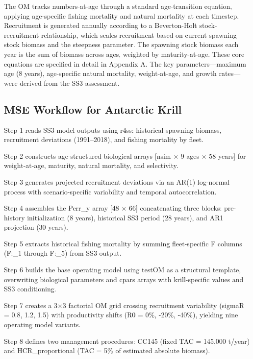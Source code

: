\documentclass[
]{article}
\begin{document}
The OM tracks numbers-at-age through a standard age-transition equation, applying age-specific fishing mortality and natural mortality at each timestep. Recruitment is generated annually according to a Beverton-Holt stock-recruitment relationship, which scales recruitment based on current spawning stock biomass and the steepness parameter. The spawning stock biomass each year is the sum of biomass across ages, weighted by maturity-at-age. These core equations are specified in detail in Appendix A. The key parameters---maximum age (8 years), age-specific natural mortality, weight-at-age, and growth rates---were derived from the SS3 assessment.

\hypertarget{mse-workflow-for-antarctic-krill}{%
\subsection{MSE Workflow for Antarctic Krill}\label{mse-workflow-for-antarctic-krill}}

Step 1 reads SS3 model outputs using r4ss: historical spawning biomass, recruitment deviations (1991--2018), and fishing mortality by fleet.

Step 2 constructs age-structured biological arrays {[}nsim × 9 ages × 58 years{]} for weight-at-age, maturity, natural mortality, and selectivity.

Step 3 generates projected recruitment deviations via an AR(1) log-normal process with scenario-specific variability and temporal autocorrelation.

Step 4 assembles the Perr\_y array {[}48 × 66{]} concatenating three blocks: pre-history initialization (8 years), historical SS3 period (28 years), and AR1 projection (30 years).

Step 5 extracts historical fishing mortality by summing fleet-specific F columns (F:\_1 through F:\_5) from SS3 output.

Step 6 builds the base operating model using testOM as a structural template, overwriting biological parameters and cpars arrays with krill-specific values and SS3 conditioning.

Step 7 creates a 3×3 factorial OM grid crossing recruitment variability (sigmaR = 0.8, 1.2, 1.5) with productivity shifts (R0 = 0\%, -20\%, -40\%), yielding nine operating model variants.

Step 8 defines two management procedures: CC145 (fixed TAC = 145,000 t/year) and HCR\_proportional (TAC = 5\% of estimated absolute biomass).
\end{document}
